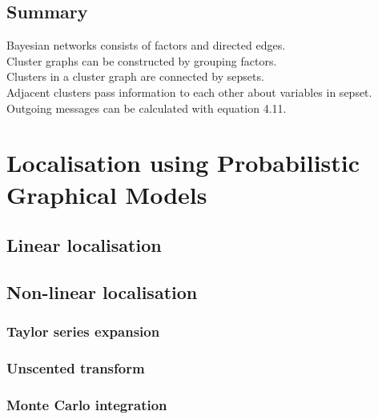 \documentclass[12pt,oneside,openany,a4paper, %
afrikaans,english,
]{memoir}
\numberwithin{equation}{chapter}
\begin{document}
\section{Summary}
Bayesian networks consists of factors and directed edges.\\
Cluster graphs can be constructed by grouping factors.\\
Clusters in a cluster graph are connected by sepsets.\\
Adjacent clusters pass information to each other about variables in sepset.\\
Outgoing messages can be calculated with equation 4.11.

\chapter{Localisation using Probabilistic Graphical Models}
\section{Linear localisation}
\section{Non-linear localisation}
\subsection{Taylor series expansion}
\subsection{Unscented transform}
\subsection{Monte Carlo integration}

\backmatter
{}
\end{document}
